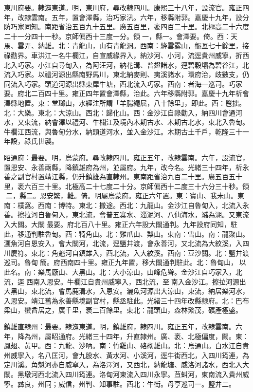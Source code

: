 \begin{pinyinscope}
東川府要。隸迤東道。明，東川府，尋改隸四川。康熙三十八年，設流官。雍正四年，改隸雲南。五年，置會澤縣，治巧家汛。六年，移縣附郭。嘉慶十九年，設分防巧家同知。南距省治五百九十五里。廣五百里，袤四百二十里。北極高二十六度二十一分四十一秒。京師偏西十三度一分。領一，縣一。會澤要。倚。西：天馬、雲弄、納雄。北：青龍山，山有青龍洞。西南：絳雲露山，盤亙七十餘里，接祿勸界。車洪江一名牛欄江，自宣威緣界入，納沙河、小河，流逕貴州威寧，折西北入巧家。小江自尋甸入，為阿汪河，納花溝、普翅諸水，逕碧穀壩為碧谷江，北流入巧家。以禮河源出縣南野馬川，東北納麥則、夷溪諸水，環府治，歧數支，仍同流入巧家。頭道河源出縣東犀牛塘，西北流入巧家。西南：者海一巡司。巧家要。府北二百四十里。雍正四年置會澤縣，治此。六年移縣附郭。嘉慶十九年析會澤縣地置。東：堂瑯山，水經注所謂「羊腸繩屈，八十餘里」，即此。西：鬯拙。北：大樂。東北：大涼山。西北：歸化山。西：金沙江自祿勸入，納四川會通河水，又東流，納會澤以禮河、牛欄江及境內木期古水、木期古北水，東北入魯甸。牛欄江西流，與魯甸分水，納頭道河水，並入金沙江。木期古土千戶，乾隆三十一年設，祿氏世襲。

眧通府：最要。明，烏蒙府。尋改隸四川。雍正五年，改隸雲南。六年，設流官，置恩安、永善兩縣，降鎮雄府為州，並屬府。九年，改今名。光緒三十四年，析永善之副官村置靖江縣，仍升鎮雄為直隸州。東南距省治九百二十里。廣五百五十里，袤六百三十里。北極高二十七度二十分。京師偏西十二度三十六分三十秒。領二，縣二。恩安繁，難。倚。明屬烏蒙府。雍正六年置。東：寶山、我未山。東南：樸窩。西南：博特。東北：撒途。西北：九龍山。金沙江自魯甸入，北流入永善。擦拉河自魯甸入，東北流，會普五寨水、淄泥河、八仙海水，瀦為湖。又東流入大關。大關最要。府北百八十里。雍正六年設大關通判。九年設府同知，駐此，移通判駐魯甸。西：犄角山。北：雞爪山、梨山。東南：雪山。南：龍聚山。灑魚河自恩安入，會大關河，北流，逕鹽井渡，會永善河，又北流為大紋溪，入四川慶符。東北：角魁河自鎮雄入，西北流，入大紋溪。西南：豆沙關。北：鹽井渡巡司。魯甸簡。府西南四十里。雍正九年置，移大關通判駐此。北：魯甸山，以此名。南：樂馬廠山、大黑山。北：大小涼山，山峰危聳。金沙江自巧家入，北流，逕西南入恩安。牛欄江自貴州威寧入，西北流，至南入金沙江。擦拉河源出大黑山，東北流，會馬鹿溝水，入恩安。灑魚河源出大涼山，東流，納居樂河水，入恩安。靖江舊為永善縣境副官村，縣丞駐此。光緒三十四年改縣隸府。北：巴布梁山，蠻酋居之，廣千里，袤二百餘里。東北：龍頭山，森林繁茂，礦產極盛。

鎮雄直隸州：最要。隸迤東道。明，鎮雄府，隸四川。雍正五年，改隸雲南。六年，降為州，屬眧通府。光緒三十四年，升直隸州。廣、袤、北極偏度，闕。東：鳳翅、黃甲。西：九龍、沙吶。南：竹雞山、硌砌雄山。北：烏通山。白水江自貴州威寧入，名八匡河，會九股水、黃水河、小溪河，逕牛街西北，入四川筠連，為定川溪。角魁河亦自威寧入，為洛澤河，又西北，納龍塘、威洛河諸水，西北入大關。黑墩河西北流入四川筠連。洛甸河東流入四川永寧。苴虯河，東南流入貴州威寧。彞良，州同；威信，州判、知事駐。西北：牛街。母亨巡司一。鹽井二。


\end{pinyinscope}
